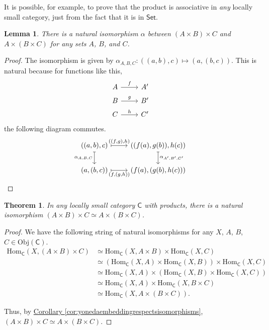 \documentclass[a4paper]{report}
\newcommand{\Obj}{\mathrm{Obj}}
\newcommand{\Hom}{\mathrm{Hom}}
\theoremstyle{definition}
\theoremstyle{plain}
\newtheorem{theorem}{Theorem}[section]
\newtheorem{lemma}{Lemma}[section]
\theoremstyle{remark}
\begin{document}
It is possible, for example, to prove that the product is associative in \emph{any} locally small category, just from the fact that it is in $\mathsf{Set}$.
\begin{lemma}
  There is a natural isomorphism $\alpha$ between $(A \times B) \times C$ and $A \times (B \times C)$ for any sets $A$, $B$, and $C$.
\end{lemma}
\begin{proof}
  The isomorphism is given by $\alpha_{A, B, C}\colon ((a, b), c) \mapsto (a, (b, c))$. This is natural because for functions like this,
  \begin{equation*}
    \begin{tikzcd}[row sep=tiny]
      A 
      \arrow[r, "f"]
      & A'
      \\
      B 
      \arrow[r, "g"]
      & B'
      \\
      C 
      \arrow[r, "h"]
      & C'
    \end{tikzcd}
  \end{equation*}
  the following diagram commutes.
  \begin{equation*}
    \begin{tikzcd}
      ((a, b), c)
      \arrow[r, mapsto, "{((f, g), h)}"]
      \arrow[d, mapsto, swap, "{\alpha_{A, B, C}}"]
      & ((f(a), g(b)), h(c))
      \arrow[d, mapsto, "{\alpha_{A', B', C'}}"]
      \\
      (a, (b, c))
      \arrow[r, mapsto, swap, "{(f, (g, h))}"]
      & (f(a), (g(b), h(c)))
    \end{tikzcd}
  \end{equation*}
\end{proof}
\begin{theorem}
  \label{thm:categoricalproductisassociative}
  In any locally small category $\mathsf{C}$ with products, there is a natural isomorphism $(A \times B) \times C \simeq A \times (B \times C)$.
\end{theorem}
\begin{proof}
  We have the following string of natural isomorphisms for any $X$, $A$, $B$, $C \in \Obj(\mathsf{C})$.
  \begin{align*}
    \Hom_{\mathsf{C}}(X, (A \times B) \times C) &\simeq \Hom_{\mathsf{C}}(X, A \times B) \times \Hom_{\mathsf{C}}(X, C) \\
    & \simeq (\Hom_{\mathsf{C}}(X, A) \times \Hom_{\mathsf{C}}(X, B)) \times \Hom_{\mathsf{C}}(X, C) \\
    & \simeq \Hom_{\mathsf{C}}(X, A) \times (\Hom_{\mathsf{C}}(X, B) \times \Hom_{\mathsf{C}}(X, C)) \\
    & \simeq \Hom_{\mathsf{C}}(X, A) \times \Hom_{\mathsf{C}}(X, B \times C) \\
    & \simeq \Hom_{\mathsf{C}}(X, A \times (B \times C)).
  \end{align*}

  Thus, by \hyperref[cor:yonedaembeddingrespectsisomorphisms]{Corollary \ref*{cor:yonedaembeddingrespectsisomorphisms}}, $(A \times B) \times C \simeq A \times (B \times C)$.
\end{proof}
\end{document}
